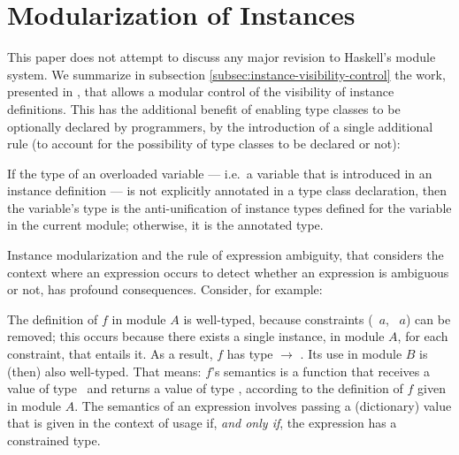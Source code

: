 \section{Modularization of Instances}
\label{sec:modular-instances}

This paper does not attempt to discuss any major revision to Haskell's
module system. We summarize in subsection
\ref{subsec:instance-visibility-control} the work, presented in
\cite{Controlling-scope-instances}, that allows a modular control of
the visibility of instance definitions. This has the additional
benefit of enabling type classes to be optionally declared by
programmers, by the introduction of a single additional rule (to
account for the possibility of type classes to be declared or not):

\begin{definition}

If the type of an overloaded variable --- i.e.~a variable that is
introduced in an instance definition --- is not explicitly annotated
in a type class declaration, then the variable's type is the
anti-unification of instance types defined for the variable in the
current module; otherwise, it is the annotated type.

\label{overloaded-variable-type}
\end{definition}

Instance modularization and the rule of expression ambiguity, that
considers the context where an expression occurs to detect whether an
expression is ambiguous or not, has profound consequences. Consider,
for example:


The definition of $f$ in module $A$ is well-typed, because constraints
(\SShow\ $a$, \RRead\ $a$) can be removed; this occurs because there
exists a single instance, in module $A$, for each constraint, that
entails it. As a result, $f$ has type \String $\rightarrow$
\String. Its use in module $B$ is (then) also well-typed. That means:
$f$'s semantics is a function that receives a value of type
\String\ and returns a value of type \String, according to the
definition of $f$ given in module $A$. The semantics of an expression
involves passing a (dictionary) value that is given in the context of
usage if, {\em and only if}, the expression has a constrained type.

